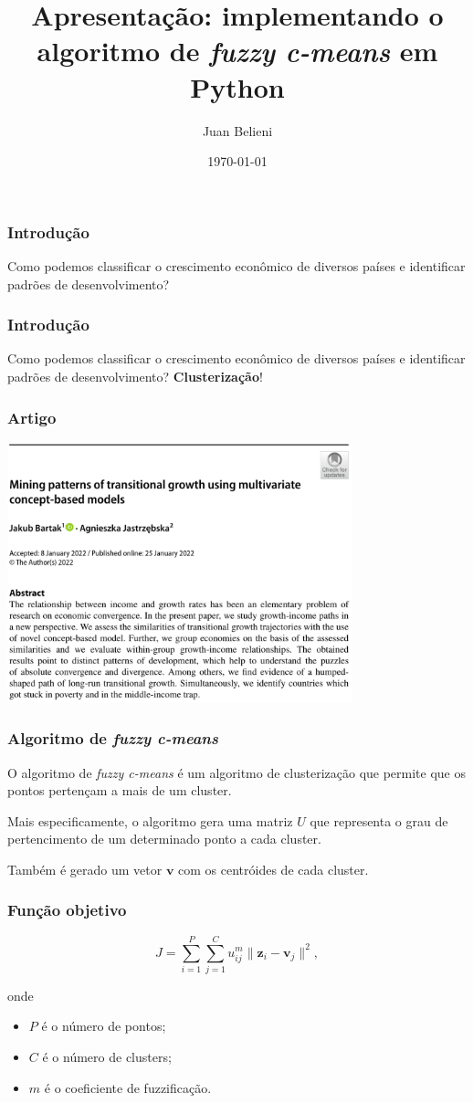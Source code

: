\documentclass{beamer}
\author{Juan Belieni}
\title{Apresentação: implementando o algoritmo de \textit{fuzzy c-means} em Python}
\date{\today}
\begin{document}
\frame{\titlepage}

\begin{frame}
\frametitle{Introdução}

Como podemos classificar o crescimento econômico de diversos países e identificar padrões de desenvolvimento?

\end{frame}

\begin{frame}
\frametitle{Introdução}
Como podemos classificar o crescimento econômico de diversos países e identificar padrões de desenvolvimento?
\textbf{Clusterização}!
\end{frame}

\begin{frame}
\frametitle{Artigo}
\center\includegraphics[width=0.75\textwidth]{article.png}
\end{frame}

\begin{frame}
\frametitle{Algoritmo de \textit{fuzzy c-means}}
O algoritmo de \textit{fuzzy c-means} é um algoritmo de clusterização que permite que os pontos pertençam a mais de um cluster.

Mais especificamente, o algoritmo gera uma matriz $U$ que representa o grau de pertencimento de um determinado ponto a cada cluster.

Também é gerado um vetor $\mathbf{v}$ com os centróides de cada cluster.
\end{frame}

\begin{frame}
\frametitle{Função objetivo}
\begin{equation}
J = \sum_{i=1}^P \sum_{j=1}^C u_{ij}^m \| \mathbf z_i - \mathbf v_j \|^2,
\end{equation}

onde

\begin{itemize}
\item $P$ é o número de pontos;
\item $C$ é o número de clusters;
\item $m$ é o coeficiente de fuzzificação.
\end{itemize}
\end{frame}
\end{document}
